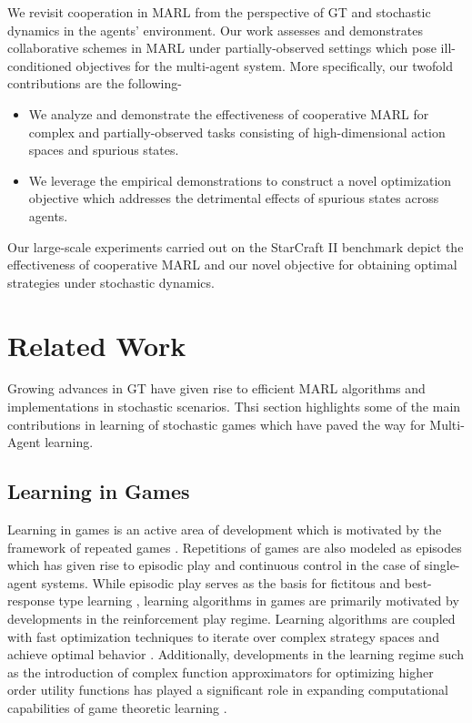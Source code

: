 \documentclass{article}
\begin{document}
\begin{multicols}{2}
We revisit cooperation in MARL from the perspective of GT and stochastic dynamics in the agents' environment. Our work assesses and demonstrates collaborative schemes in MARL under partially-observed settings which pose ill-conditioned objectives for the multi-agent system. More specifically, our twofold contributions are the following- 

\begin{itemize}[leftmargin=*]
\item We analyze and demonstrate the effectiveness of cooperative MARL for complex and partially-observed tasks consisting of high-dimensional action spaces and spurious states.
\item We leverage the empirical demonstrations to construct a novel optimization objective which addresses the detrimental effects of spurious states across agents. 
\end{itemize}

Our large-scale experiments carried out on the StarCraft II benchmark depict the effectiveness of cooperative MARL and our novel objective for obtaining optimal strategies under stochastic dynamics.

\section{Related Work}
Growing advances in GT have given rise to efficient MARL algorithms and implementations in stochastic scenarios. Thsi section highlights some of the main contributions in learning of stochastic games which have paved the way for Multi-Agent learning. 

\subsection{Learning in Games}
Learning in games is an active area of development which is motivated by the framework of repeated games \cite{learningingames}. Repetitions of games are also modeled as episodes which has given rise to episodic play and continuous control in the case of single-agent systems. While episodic play serves as the basis for fictitous \cite{benaim} and best-response type learning \cite{learningingames}, learning algorithms in games are primarily motivated by developments in the reinforcement play regime\cite{rl}. Learning algorithms are coupled with fast optimization techniques \cite{atari} to iterate over complex strategy spaces and achieve optimal behavior \cite{rl}. Additionally, developments in the learning regime such as the introduction of complex function approximators \cite{cnn} for optimizing higher order utility functions has played a significant role in expanding computational capabilities of game theoretic learning \cite{ale}. 


\end{multicols}
\end{document}
